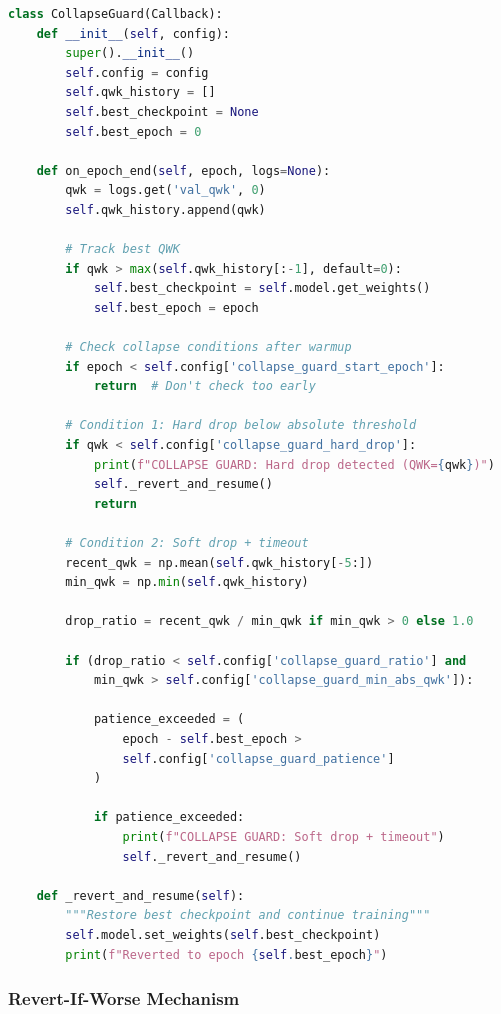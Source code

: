 \documentclass[12pt,a4paper]{article}
\begin{document}
\begin{lstlisting}[language=python, caption=Collapse Guard Implementation]
class CollapseGuard(Callback):
    def __init__(self, config):
        super().__init__()
        self.config = config
        self.qwk_history = []
        self.best_checkpoint = None
        self.best_epoch = 0
    
    def on_epoch_end(self, epoch, logs=None):
        qwk = logs.get('val_qwk', 0)
        self.qwk_history.append(qwk)
        
        # Track best QWK
        if qwk > max(self.qwk_history[:-1], default=0):
            self.best_checkpoint = self.model.get_weights()
            self.best_epoch = epoch
        
        # Check collapse conditions after warmup
        if epoch < self.config['collapse_guard_start_epoch']:
            return  # Don't check too early
        
        # Condition 1: Hard drop below absolute threshold
        if qwk < self.config['collapse_guard_hard_drop']:
            print(f"COLLAPSE GUARD: Hard drop detected (QWK={qwk})")
            self._revert_and_resume()
            return
        
        # Condition 2: Soft drop + timeout
        recent_qwk = np.mean(self.qwk_history[-5:])
        min_qwk = np.min(self.qwk_history)
        
        drop_ratio = recent_qwk / min_qwk if min_qwk > 0 else 1.0
        
        if (drop_ratio < self.config['collapse_guard_ratio'] and
            min_qwk > self.config['collapse_guard_min_abs_qwk']):
            
            patience_exceeded = (
                epoch - self.best_epoch >
                self.config['collapse_guard_patience']
            )
            
            if patience_exceeded:
                print(f"COLLAPSE GUARD: Soft drop + timeout")
                self._revert_and_resume()
    
    def _revert_and_resume(self):
        """Restore best checkpoint and continue training"""
        self.model.set_weights(self.best_checkpoint)
        print(f"Reverted to epoch {self.best_epoch}")
\end{lstlisting}

\subsubsection{Revert-If-Worse Mechanism}
\end{document}
